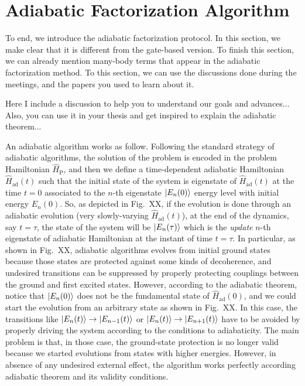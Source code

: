 \section{Adiabatic Factorization Algorithm}

To end, we introduce the adiabatic factorization protocol. In this section, we make clear that it is different from the gate-based version. To finish this section, we can already mention many-body terms that appear in the adiabatic factorization method. To this section, we can use the discussions done during the meetings, and the papers you used to learn about it.

{\color{red}Here I include a discussion to help you to understand our goals and advances... Also, you can use it in your thesis and get inspired to explain the adiabatic theorem...}

An adiabatic algorithm works as follow. Following the standard strategy of adiabatic algorithms, the solution of the problem is encoded in the problem Hamiltonian $\hat{H}_{\mathrm{P}}$, and then we define a time-dependent adiabatic Hamiltonian $\hat{H}_{\mathrm{ad}}(t)$ such that the initial state of the system is eigenstate of $\hat{H}_{\mathrm{ad}}(t)$ at the time $t=0$ associated to the $n$-th eigenstate $\ket{E_{n}(0)}$ energy level with initial energy $E_{n}(0)$. So, as depicted in Fig.~XX, if the evolution is done through an adiabatic evolution (very slowly-varying $\hat{H}_{\mathrm{ad}}(t)$), at the end of the dynamics, say $t=\tau$, the state of the system will be $\ket{E_{n}(\tau)}$ which is the \textit{update} $n$-th eigenstate of adiabatic Hamiltonian at the instant of time $t = \tau$. In particular, as shown in Fig.~XX, adiabatic algorithms evolves from initial ground states because those states are protected against some kinds of decoherence, and undesired transitions can be suppressed by properly protecting couplings between the ground and first excited states. However, according to the adiabatic theorem, notice that $\ket{E_{n}(0)}$ does not be the fundamental state of $\hat{H}_{\mathrm{ad}}(0)$, and we could start the evolution from an arbitrary state as shown in Fig.~XX. In this case, the transitions like $\ket{E_{n}(t)}\rightarrow\ket{E_{n-1}(t)}$ or $\ket{E_{n}(t)}\rightarrow\ket{E_{n+1}(t)}$ have to be avoided by properly driving the system according to the conditions to adiabaticity. The main problem is that, in those case, the ground-state protection is no longer valid because we started evolutions from states with higher energies. However, in absence of any undesired external effect, the algorithm works perfectly according adiabatic theorem and its validity conditions.

